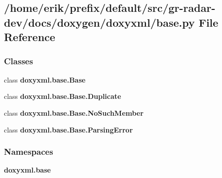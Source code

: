 \subsection{/home/erik/prefix/default/src/gr-\/radar-\/dev/docs/doxygen/doxyxml/base.py File Reference}
\label{base_8py}
\subsubsection*{Classes}
\begin{DoxyCompactItemize}
\item 
class {\bf doxyxml.\+base.\+Base}
\item 
class {\bf doxyxml.\+base.\+Base.\+Duplicate}
\item 
class {\bf doxyxml.\+base.\+Base.\+No\+Such\+Member}
\item 
class {\bf doxyxml.\+base.\+Base.\+Parsing\+Error}
\end{DoxyCompactItemize}
\subsubsection*{Namespaces}
\begin{DoxyCompactItemize}
\item 
 {\bf doxyxml.\+base}
\end{DoxyCompactItemize}
